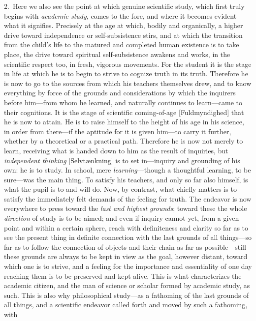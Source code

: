\documentclass[12pt,a4paper]{book}
\begin{document}
2.~Here we also see the point at which genuine scientific study, which
first truly begins with \emph{academic study}, comes to the fore, and where it
becomes evident what it signifies. Precisely at the age at which, bodily and
organically, a higher drive toward independence or self-subsistence stirs, and at
which the transition from the child's life to the matured and completed human
existence is to take place, the drive toward spiritual self-subsistence awakens
and works, in the scientific respect too, in fresh, vigorous movements. For the
student it is the stage in life at which he is to begin to strive to cognize truth
in its truth. Therefore he is now to go to the sources from which his teachers
themselves drew, and to know everything by force of the grounds and considerations
by which the inquirers before him---from whom he learned, and naturally continues
to learn---came to their cognitions. It is the stage of scientific coming-of-age
[Fuldmyndighed] that he is now to attain. He is to raise himself to the height of
his age in his science, in order from there---if the aptitude for it is given
him---to carry it further, whether by a theoretical or a practical path. Therefore
he is now not merely to learn, receiving what is handed down to him as the result
of inquiries, but \emph{independent thinking} [Selvtænkning] is to set in---inquiry
and grounding of his own: he is to study. In school, mere \emph{learning}---though
a thoughtful learning, to be sure---was the main thing. To satisfy his teachers,
and only so far also himself, is what the pupil is to and will do. Now, by
contrast, what chiefly matters is to satisfy the immediately felt demands of the
feeling for truth. The endeavor is now everywhere to press toward the \emph{last
and highest grounds}; toward these the whole \emph{direction} of study is to be aimed;
and even if inquiry cannot yet, from a given point and within a certain sphere,
reach with definiteness and clarity so far as to see the present thing in definite
connection with the last grounds of all things---so far as to follow the
connection of objects and their chain as far as possible---still these grounds are
always to be kept in view as the goal, however distant, toward which one is to
strive, and a feeling for the importance and essentiality of one day reaching them
is to be preserved and kept alive. This is what characterizes the academic
citizen, and the man of science or scholar formed by academic study, as such. This
is also why philosophical study---as a fathoming of the last grounds of all
things, and a scientific endeavor called forth and moved by such a fathoming, with
\end{document}
